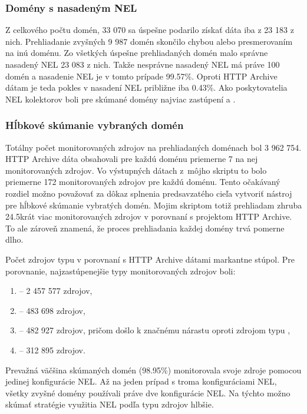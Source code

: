 \subsubsection{Domény s nasadeným NEL}

Z celkového počtu domén, 33 070 sa úspešne podarilo získať dáta iba z 23 183 z nich.
Prehliadanie zvyšných 9 987 domén skončilo chybou alebo presmerovaním na inú doménu. 
Zo všetkých úspešne prehliadaných domén malo správne nasadený NEL 23 083 z nich.
Takže nesprávne nasadený NEL má práve 100 domén a nasadenie NEL je v tomto prípade 99.57\%.
Oproti HTTP Archive dátam je teda pokles v nasadení NEL približne iba 0.43\%.
Ako poskytovatelia NEL kolektorov boli pre skúmané domény najviac zastúpení  a .

\subsubsection{Hĺbkové skúmanie vybraných domén}

Totálny počet monitorovaných zdrojov na prehliadaných doménach bol 3 962 754.
HTTP Archive dáta obsahovali pre každú doménu priemerne 7 na nej monitorovaných zdrojov.
Vo výstupných dátach \mbox{z môjho} skriptu to bolo priemerne 172 monitorovaných zdrojov pre každú doménu.  
Tento očakávaný rozdiel možno považovať za dôkaz splnenia predsavzatého cieľa vytvoriť nástroj pre hĺbkové skúmanie vybratých domén. 
Mojim skriptom totiž prehliadam zhruba 24.5krát viac monitorovaných zdrojov v porovnaní s projektom HTTP Archive.
To ale zároveň znamená, že proces prehliadania každej domény trvá pomerne dlho.

Počet zdrojov typu  v porovnaní s HTTP Archive dátami markantne stúpol.
Pre porovnanie, najzastúpenejšie typy monitorovaných zdrojov boli:
\begin{enumerate}
    \item {} -- 2 457 577 zdrojov,
    \item {} -- 483 698 zdrojov,
    \item {} -- 482 927 zdrojov, pričom došlo k značnému nárastu oproti zdrojom typu ,
    \item {} -- 312 895 zdrojov.
\end{enumerate}

Prevažná väčšina skúmaných domén (98.95\%) monitorovala svoje zdroje pomocou jedinej konfigurácie NEL. 
Až na jeden prípad s troma konfiguráciami NEL, všetky zvyšné domény používali práve dve konfigurácie NEL.
Na týchto možno skúmať stratégie využitia NEL podľa typu zdrojov hlbšie.

